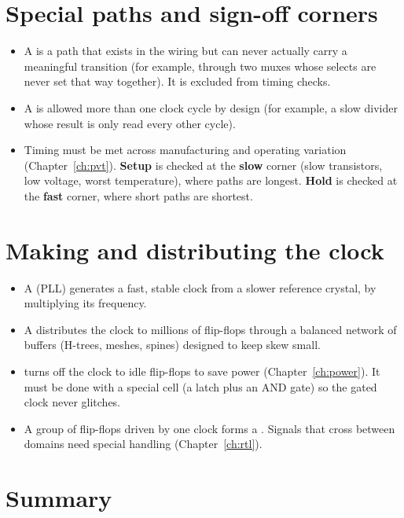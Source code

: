 \section{Special paths and sign-off corners}

\begin{itemize}
  \item A  is a path that exists in the wiring but can never actually carry a meaningful transition (for example, through two muxes whose selects are never set that way together). It is excluded from timing checks.
  \item A  is allowed more than one clock cycle by design (for example, a slow divider whose result is only read every other cycle).
  \item Timing must be met across manufacturing and operating variation (Chapter~\ref{ch:pvt}). \textbf{Setup} is checked at the \textbf{slow} corner (slow transistors, low voltage, worst temperature), where paths are longest. \textbf{Hold} is checked at the \textbf{fast} corner, where short paths are shortest.
\end{itemize}

\section{Making and distributing the clock}
\label{sec:clockgen}

\begin{itemize}
  \item A  (PLL) generates a fast, stable clock from a slower reference crystal, by multiplying its frequency.
  \item A  distributes the clock to millions of flip-flops through a balanced network of buffers (H-trees, meshes, spines) designed to keep skew small.
  \item {} turns off the clock to idle flip-flops to save power (Chapter~\ref{ch:power}). It must be done with a special cell (a latch plus an AND gate) so the gated clock never glitches.
  \item A group of flip-flops driven by one clock forms a . Signals that cross between domains need special handling (Chapter~\ref{ch:rtl}).
\end{itemize}

\section{Summary}

